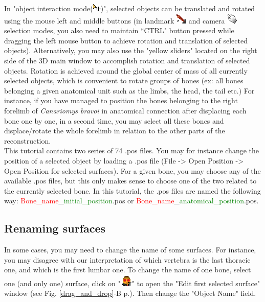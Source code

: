 \documentclass[12pt, a4paper]{book}
\begin{document}
In "object interaction mode(\includegraphics[scale=0.7]{../images/04/move_mode.png})", selected objects can be translated and rotated using the mouse left and middle buttons (in landmark \includegraphics[scale=0.7]{../images/04/Landmarks2.png} and camera  \includegraphics[scale=0.7]{../images/04/camera_mode.png} selection modes, you also need to maintain ``CTRL" button pressed while dragging the left mouse button to achieve rotation and translation of selected objects). Alternatively, you may also use the "yellow sliders" located on the right side of the 3D main window to accomplish rotation and translation of selected objects. Rotation is achieved around the global center of mass of all currently selected objects, which is convenient to rotate groups of bones (ex: all bones belonging a given anatomical unit such as the limbs, the head, the tail etc.) For instance, if you have managed to position the bones belonging to the right
forelimb of \textit{Canariomys bravoi} in anatomical connection after displacing each bone one by one, in a second time, you may select all these bones and displace/rotate the whole forelimb in relation to the other parts of the reconstruction.\\

This tutorial contains two series of 74 .pos files. You may for instance change the position of a selected object by loading a .pos file (File -> Open Position -> Open Position for selected surfaces). For a given bone, you may choose any of the available .pos files, but this only makes sense to choose one of the two related to the currently selected bone. In this tutorial, the .pos files are named the following way:  \textcolor{red}{Bone\_name}\_\textcolor{green}{initial\_position}.pos
or \textcolor{red}{Bone\_name}\_\textcolor{green}{anatomical\_position}.pos.

\subsection{Renaming surfaces}
In some cases, you may need to change the name of some surfaces. For instance, you may disagree with our interpretation of which vertebra is the last thoracic one, and which is the first lumbar one. To change the name of one bone, select one (and only one) surface, click on "\includegraphics[scale=0.7]{../images/06/objects/actor_edit.png}" to open the "Edit first selected surface" window (see Fig. \ref{drag_and_drop}-B p.\pageref{drag_and_drop}). Then change the "Object Name" field.
\end{document}
